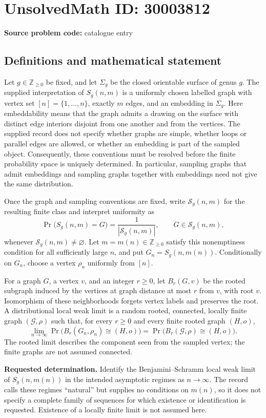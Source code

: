 \documentclass[11pt]{article}
\newcommand{\Z}{\mathbb{Z}}
\begin{document}
\section*{UnsolvedMath ID: 30003812}
\textbf{Source problem code:} catalogue entry
\subsection{Definitions and mathematical statement}
Let \(g\in\Z_{\geq 0}\) be fixed, and let \(\Sigma_g\) be the closed orientable surface of genus \(g\). The supplied interpretation of \(S_g(n,m)\) is a uniformly chosen labelled graph with vertex set \([n]=\{1,\ldots,n\}\), exactly \(m\) edges, and an embedding in \(\Sigma_g\). Here embeddability means that the graph admits a drawing on the surface with distinct edge interiors disjoint from one another and from the vertices. The supplied record does not specify whether graphs are simple, whether loops or parallel edges are allowed, or whether an embedding is part of the sampled object. Consequently, these conventions must be resolved before the finite probability space is uniquely determined. In particular, sampling graphs that admit embeddings and sampling graphs together with embeddings need not give the same distribution.

Once the graph and sampling conventions are fixed, write \(\mathcal S_g(n,m)\) for the resulting finite class and interpret uniformity as
\[
\Pr\bigl(S_g(n,m)=G\bigr)=\frac{1}{|\mathcal S_g(n,m)|},\qquad G\in\mathcal S_g(n,m),
\]
whenever \(\mathcal S_g(n,m)\neq\varnothing\). Let \(m=m(n)\in\Z_{\geq0}\) satisfy this nonemptiness condition for all sufficiently large \(n\), and put \(G_n=S_g(n,m(n))\). Conditionally on \(G_n\), choose a vertex \(\rho_n\) uniformly from \([n]\).

For a graph \(G\), a vertex \(v\), and an integer \(r\geq0\), let \(B_r(G,v)\) be the rooted subgraph induced by the vertices at graph distance at most \(r\) from \(v\), with root \(v\). Isomorphism of these neighborhoods forgets vertex labels and preserves the root. A distributional local weak limit is a random rooted, connected, locally finite graph \((\mathcal G,\rho)\) such that, for every \(r\geq0\) and every finite rooted graph \((H,o)\),
\[
\lim_{n\to\infty}\Pr\bigl(B_r(G_n,\rho_n)\cong(H,o)\bigr)
=\Pr\bigl(B_r(\mathcal G,\rho)\cong(H,o)\bigr).
\]
The rooted limit describes the component seen from the sampled vertex; the finite graphs are not assumed connected.

\textbf{Requested determination.} Identify the Benjamini--Schramm local weak limit of \(S_g(n,m(n))\) in the intended asymptotic regimes as \(n\to\infty\). The record calls these regimes ``natural'' but supplies no conditions on \(m(n)\), so it does not specify a complete family of sequences for which existence or identification is requested. Existence of a locally finite limit is not assumed here.
\end{document}
